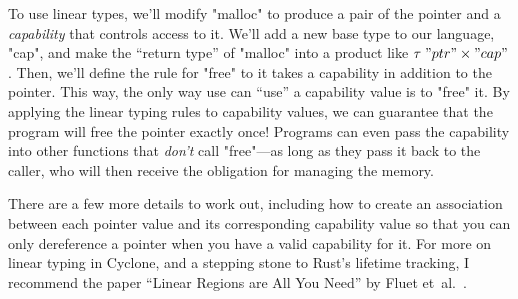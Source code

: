 To use linear types, we'll modify "malloc" to produce a pair of the
pointer and a \emph{capability} that controls access to it.
We'll add a new base type to our language, "cap", and make the ``return type''
of "malloc" into a product like $\tau \; "ptr" \times "cap"$.
Then, we'll define the rule for "free" to it takes a capability in addition to
the pointer.
This way, the only way use can ``use'' a capability value is to "free" it.
By applying the linear typing rules to capability values, we can guarantee that
the program will free the pointer exactly once!
Programs can even pass the capability into other functions that \emph{don't}
call "free"---as long as they pass it back to the caller, who will then
receive the obligation for managing the memory.

There are a few more details to work out, including how to create an
association between each pointer value and its corresponding capability value
so that you can only dereference a pointer when you have a valid capability
for it.
For more on linear typing in Cyclone, and a stepping stone to Rust's lifetime
tracking, I recommend the paper ``Linear Regions are All You Need'' by Fluet
et~al.~\cite{linregion}.
